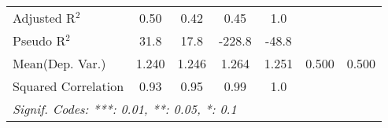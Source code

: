 \begin{tabular}{lcccccc}
   Adjusted R$^2$                                             & 0.50         & 0.42         & 0.45          & 1.0       &     & \\  
   Pseudo R$^2$                                               & 31.8         & 17.8         & -228.8        & -48.8     &     & \\  
Mean(Dep. Var.) & 1.240 & 1.246 & 1.264 & 1.251 & 0.500 & 0.500 \\
   Squared Correlation                                        & 0.93         & 0.95         & 0.99          & 1.0       &     & \\  
   \midrule \midrule
   \multicolumn{7}{l}{\emph{Signif. Codes: ***: 0.01, **: 0.05, *: 0.1}}\\
\end{tabular}
\par\endgroup
